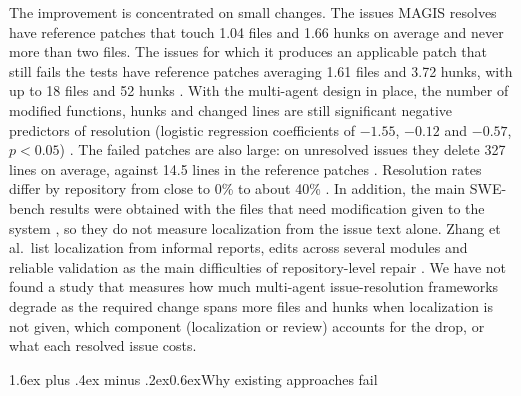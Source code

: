 \documentclass[10pt,a4paper]{article}
\makeatletter
\renewcommand\section{\@startsection{section}{1}{\z@}%
  {1.6ex plus .4ex minus .2ex}{0.6ex}{\normalfont\normalsize\bfseries}}
\makeatother
\begin{document}
The improvement is concentrated on small changes. The issues MAGIS resolves have reference patches that touch 1.04 files and 1.66 hunks on average and never more than two files. The issues for which it produces an applicable patch that still fails the tests have reference patches averaging 1.61 files and 3.72 hunks, with up to 18 files and 52 hunks \cite[Table~5]{tao2024magis}. With the multi-agent design in place, the number of modified functions, hunks and changed lines are still significant negative predictors of resolution (logistic regression coefficients of $-1.55$, $-0.12$ and $-0.57$, $p<0.05$) \cite[Table~3]{tao2024magis}. The failed patches are also large: on unresolved issues they delete 327 lines on average, against 14.5 lines in the reference patches \cite[Table~5]{tao2024magis}. Resolution rates differ by repository from close to 0\% to about 40\% \cite[Fig.~13]{tao2024magis}. In addition, the main SWE-bench results were obtained with the files that need modification given to the system \cite[\S4.1]{tao2024magis}, so they do not measure localization from the issue text alone. Zhang et al.\ list localization from informal reports, edits across several modules and reliable validation as the main difficulties of repository-level repair \cite[\S7.4]{zhang2026slr}. We have not found a study that measures how much multi-agent issue-resolution frameworks degrade as the required change spans more files and hunks when localization is not given, which component (localization or review) accounts for the drop, or what each resolved issue costs.

\section{Why existing approaches fail}
\end{document}
